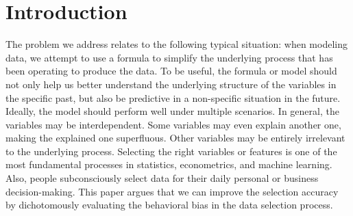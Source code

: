 \documentclass[a4paper,12pt]{article}
\begin{document}



\newpage



\section{Introduction}

\noindent The problem we address relates to the following typical situation: 
when modeling data, we attempt to use a formula to simplify the underlying process that has been operating to produce the data. 
To be useful, the formula or model should not only help us better understand the underlying structure of the variables in the specific past, but also be predictive in a non-specific situation in the future.
Ideally, the model should perform well under multiple scenarios. 
In general, the variables may be interdependent. 
Some variables may even explain another one, making the explained one superfluous. 
Other variables may be entirely irrelevant to the underlying process. 
Selecting the right variables or features is one of the most fundamental processes in statistics, econometrics, and machine learning.
Also, people subconsciously select data for their daily personal or business decision-making. 
This paper argues that we can improve the selection accuracy by dichotomously evaluating the behavioral bias in the data selection process.
\end{document}
